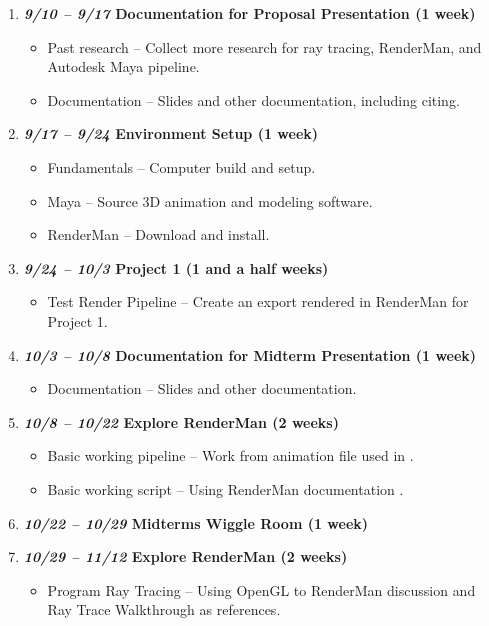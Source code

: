 \documentclass[conference]{IEEEtran}
\begin{document}
\begin{enumerate}
\item \textbf{\textit{9/10 -- 9/17} Documentation for Proposal Presentation (1 week)}
\begin{itemize}
\item Past research -- Collect more research for ray tracing, RenderMan, and Autodesk Maya pipeline.
\item Documentation -- Slides and other documentation, including citing.
\end{itemize}
\item \textbf{\textit{9/17 -- 9/24} Environment Setup (1 week)}
\begin{itemize}
\item Fundamentals -- Computer build and setup.
\item Maya -- Source 3D animation and modeling software.
\item RenderMan -- Download and install.
\end{itemize}
\item \textbf{\textit{9/24 -- 10/3} Project 1 (1 and a half weeks)}
\begin{itemize}
\item Test Render Pipeline -- Create an export rendered in RenderMan for Project 1.
\end{itemize}
\item \textbf{\textit{10/3 -- 10/8} Documentation for Midterm Presentation (1 week)}
\begin{itemize}
\item Documentation -- Slides and other documentation.
\end{itemize}
\item \textbf{\textit{10/8 -- 10/22} Explore RenderMan (2 weeks)}
\begin{itemize}
\item Basic working pipeline -- Work from animation file used in \cite{thesis_harris}.
\item Basic working script -- Using RenderMan documentation \cite{renderman_docs}.
\end{itemize}
\item \textbf{\textit{10/22 -- 10/29} Midterms Wiggle Room (1 week)}
\item \textbf{\textit{10/29 -- 11/12} Explore RenderMan (2 weeks)}
\begin{itemize}
\item Program Ray Tracing -- Using OpenGL to RenderMan discussion \cite{renderman_opengl}
and Ray Trace Walkthrough \cite{raytrace_walkthrough} as references.

\end{itemize}
\end{enumerate}
\end{document}
